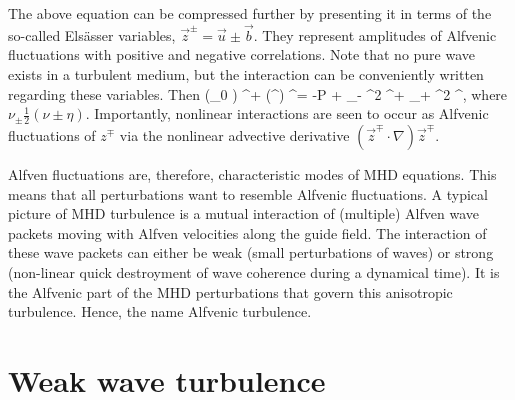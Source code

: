 \documentclass[usenatbib,twocolumn]{aastex63}
\begin{document}
The above equation can be compressed further by presenting it in terms of the so-called Els\"asser variables, $\vec{z}^\pm = \vec{u} \pm \vec{b}$.
They represent amplitudes of Alfvenic fluctuations with positive and negative correlations.
Note that no pure wave exists in a turbulent medium, but the interaction can be conveniently written regarding these variables.
Then
\be
     \mp (_0 \cdot \nabla) ^\pm + (^\mp \cdot \nabla) ^\pm = -\nabla P  + \nu_- \nabla^2 ^\pm  + \nu_+ \nabla^2 ^\mp,
\ee
where $\nu_\pm \frac{1}{2} (\nu \pm \eta)$.
Importantly, nonlinear interactions are seen to occur as Alfvenic fluctuations of $z^\mp$ via the nonlinear advective derivative $(\vec{z}^\mp \cdot \nabla) \vec{z}^\mp$.

%


Alfven fluctuations are, therefore, characteristic modes of MHD equations.
This means that all perturbations want to resemble Alfvenic fluctuations.
A typical picture of MHD turbulence is a mutual interaction of (multiple) Alfven wave packets moving with Alfven velocities along the guide field.
The interaction of these wave packets can either be weak (small perturbations of waves) or strong (non-linear quick destroyment of wave coherence during a dynamical time).
It is the Alfvenic part of the MHD perturbations that govern this anisotropic turbulence. 
Hence, the name Alfvenic turbulence.



\section{Weak wave turbulence}
\end{document}
